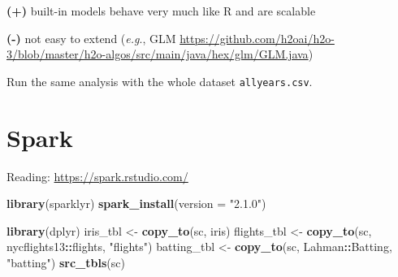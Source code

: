 \documentclass[]{book}
\newenvironment{Shaded}{\begin{snugshade}}{\end{snugshade}}
\newcommand{\KeywordTok}[1]{\textcolor[rgb]{0.13,0.29,0.53}{\textbf{#1}}}
\newcommand{\DataTypeTok}[1]{\textcolor[rgb]{0.13,0.29,0.53}{#1}}
\newcommand{\FloatTok}[1]{\textcolor[rgb]{0.00,0.00,0.81}{#1}}
\newcommand{\StringTok}[1]{\textcolor[rgb]{0.31,0.60,0.02}{#1}}
\newcommand{\OperatorTok}[1]{\textcolor[rgb]{0.81,0.36,0.00}{\textbf{#1}}}
\newcommand{\NormalTok}[1]{#1}
\theoremstyle{definition}
\theoremstyle{definition}
\theoremstyle{definition}
\theoremstyle{remark}
\let\BeginKnitrBlock\begin \let\EndKnitrBlock\end
\begin{document}
\textbf{(+)} built-in models behave very much like R and are scalable

\textbf{(-)} not easy to extend (\emph{e.g}., GLM
\url{https://github.com/h2oai/h2o-3/blob/master/h2o-algos/src/main/java/hex/glm/GLM.java})

\BeginKnitrBlock{exercise}
\protect\hypertarget{exr:unnamed-chunk-140}{}{\label{exr:unnamed-chunk-140}
}Run the same analysis with the whole dataset \texttt{allyears.csv}.
\EndKnitrBlock{exercise}

\section{Spark}\label{spark}

Reading: \url{https://spark.rstudio.com/}

\begin{Shaded}
\begin{Highlighting}[]
\KeywordTok{library}\NormalTok{(sparklyr)}
\KeywordTok{spark_install}\NormalTok{(}\DataTypeTok{version =} \StringTok{"2.1.0"}\NormalTok{)}
\end{Highlighting}
\end{Shaded}

\begin{Shaded}
\end{Shaded}

\begin{Shaded}
\begin{Highlighting}[]
\KeywordTok{library}\NormalTok{(dplyr)}
\NormalTok{iris_tbl <-}\StringTok{ }\KeywordTok{copy_to}\NormalTok{(sc, iris)}
\NormalTok{flights_tbl <-}\StringTok{ }\KeywordTok{copy_to}\NormalTok{(sc, nycflights13}\OperatorTok{::}\NormalTok{flights, }\StringTok{"flights"}\NormalTok{)}
\NormalTok{batting_tbl <-}\StringTok{ }\KeywordTok{copy_to}\NormalTok{(sc, Lahman}\OperatorTok{::}\NormalTok{Batting, }\StringTok{"batting"}\NormalTok{)}
\KeywordTok{src_tbls}\NormalTok{(sc)}
\end{Highlighting}
\end{Shaded}
\end{document}
